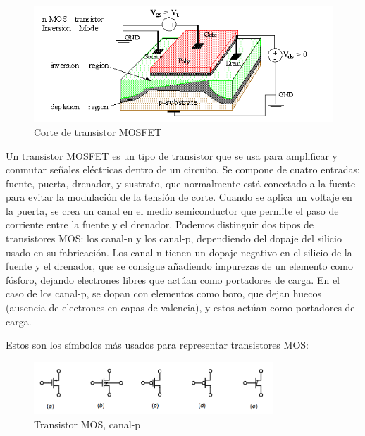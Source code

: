 \documentclass[12pt]{report} %
\begin{document}
	\begin{figure}[H]
		\includegraphics[width=\textwidth]{mos_transistor.png}
		\caption[Corte de transistor MOSFET]{Corte de transistor MOSFET\protect\footnotemark}
		\label{fig:mos_transistor.png}
	\end{figure}

	
	Un transistor MOSFET es un tipo de transistor que se usa para amplificar y conmutar señales eléctricas dentro de un circuito. Se compone de cuatro entradas: fuente, puerta, drenador, y sustrato, que normalmente está conectado a la fuente para evitar la modulación de la tensión de corte. Cuando se aplica un voltaje en la puerta, se crea un canal en el medio semiconductor que permite el paso de corriente entre la fuente y el drenador. Podemos distinguir dos tipos de transistores MOS: los canal-n y los canal-p, dependiendo del dopaje del silicio usado en su fabricación. Los canal-n tienen un dopaje negativo en el silicio de la fuente y el drenador, que se consigue añadiendo impurezas de un elemento como fósforo, dejando electrones libres que actúan como portadores de carga. En el caso de los canal-p, se dopan con elementos como boro, que dejan huecos (ausencia de electrones en capas de valencia), y estos actúan como portadores de carga.
	
	Estos son los símbolos más usados para representar transistores MOS:
	
	\begin{figure}[H]
		\includegraphics[width=0.8\textwidth]{p-mos-symbol.png}
		\caption[Transistor MOS, canal-p]{Transistor MOS, canal-p\protect\footnotemark}
		\label{fig:p-mos-symbol.png}
	\end{figure}
\end{document}
